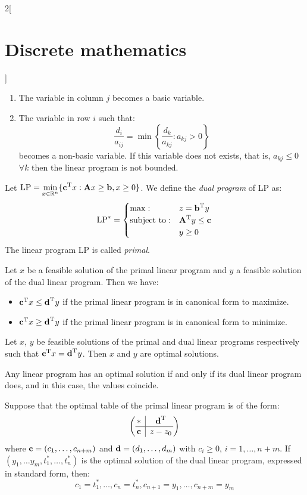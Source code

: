 \documentclass[../../../main_math.tex]{subfiles}
\begin{document}
\begin{multicols}{2}[\section{Discrete mathematics}]
\begin{enumerate}
    \item The variable in column $j$ becomes a basic variable.
    \item The variable in row $i$ such that: $$\frac{d_i}{a_{ij}}=\min\left\{\frac{d_k}{a_{kj}}:a_{kj}>0\right\}$$ becomes a non-basic variable. If this variable does not exists, that is, $a_{kj}\leq0$ $\forall k$ then the linear program is not bounded.
  \end{enumerate}
  \begin{definition}
    Let $\text{LP}=\displaystyle\min_{x\in\mathbb{R} ^n}\{{\boldsymbol{\mathrm{c}}}^{\mathrm{T}}x:\boldsymbol{\mathrm{A}}x\geq \boldsymbol{\mathrm{b}},x\geq 0\}$. We define the \emph{dual program} of LP as: $$\text{LP}^*=
      \begin{cases}
        \max:              & z={\boldsymbol{\mathrm{b}}}^{\mathrm{T}}y          \\
        \text{subject to}: & {\boldsymbol{\mathrm{A}}}^{\mathrm{T}}y\leq \boldsymbol{\mathrm{c}} \\
                           & y\geq 0
      \end{cases}$$ The linear program LP is called \emph{primal}.
  \end{definition}
  \begin{theorem}
    Let $x$ be a feasible solution of the primal linear program and $y$ a feasible solution of the dual linear program. Then we have:
    \begin{itemize}
      \item ${\boldsymbol{\mathrm{c}}}^{\mathrm{T}}x\leq {\boldsymbol{\mathrm{d}}}^{\mathrm{T}}y$ if the primal linear program is in canonical form to maximize.
      \item ${\boldsymbol{\mathrm{c}}}^{\mathrm{T}}x\geq {\boldsymbol{\mathrm{d}}}^{\mathrm{T}}y$ if the primal linear program is in canonical form to minimize.
    \end{itemize}
  \end{theorem}
  \begin{corollary}
    Let $x$, $y$ be feasible solutions of the primal and dual linear programs respectively such that ${\boldsymbol{\mathrm{c}}}^{\mathrm{T}}x={\boldsymbol{\mathrm{d}}}^{\mathrm{T}}y$. Then $x$ and $y$ are optimal solutions.
  \end{corollary}
  \begin{theorem}
    Any linear program has an optimal solution if and only if its dual linear program does, and in this case, the values coincide.
  \end{theorem}
  \begin{theorem}
    Suppose that the optimal table of the primal linear program is of the form:
    $$\left(
      \begin{array}{@{\,} c|c @{\,}}
          *      & \transpose{\vf{d}} \\
          \hline
          \vf{c} & z-z_0              \\
        \end{array}\right)$$ where $\boldsymbol{\mathrm{c}}=(c_1,\ldots,c_{n+m})$ and $\boldsymbol{\mathrm{d}}=(d_1,\ldots,d_m)$ with $c_i\geq0$, $i=1,\ldots,n+m$. If $(y_1,\ldots y_m,t_1^*,\ldots,t_n^*)$ is the optimal solution of the dual linear program, expressed in standard form, then: $$c_1=t_1^*,\ldots,c_n=t_n^*, c_{n+1}=y_1,\ldots,c_{n+m}=y_m$$
  \end{theorem}
\end{multicols}
\end{document}
